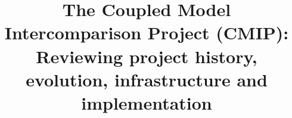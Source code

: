 \documentclass[manuscript]{copernicus}
\newcommand{\mycomment}[1]{}
\begin{document}
\title{The Coupled Model Intercomparison Project (CMIP): Reviewing project history, evolution, infrastructure and implementation}
\mycomment{
Veronika E alternate: The Coupled Model Intercomparison Project (CMIP): Reviewing project history, evolution, and infrastructure; it would be nice if the title could somehow include the word "infrastructure", as it is a big part of the paper. Maybe replace future with infrastructure? Karl: I like that idea
was: The Coupled Model Intercomparison Project phase 6 (CMIP6): A review of project evolution and future
Pete G alternate: The Coupled Model Intercomparison Project phase 6 (CMIP6) was made possible by an evolution of project implementation
Jiwoo alternate: The Coupled Model Intercomparison Project (CMIP): a review of project history, evolution and future
}

\end{document}
